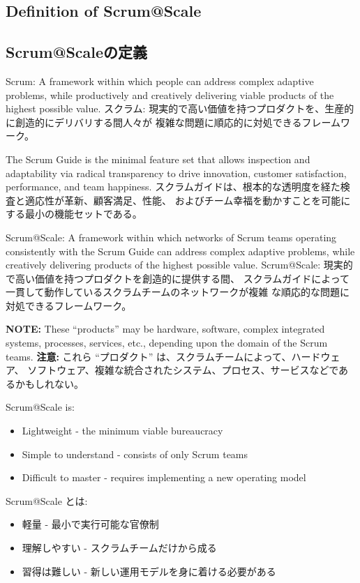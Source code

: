 \documentclass[12pt,a4paper,parskip=full]{scrartcl}
\begin{document}
\subsection{Definition of Scrum@Scale}
\fi
\subsection{Scrum@Scaleの定義}
Scrum: A framework within which people can address complex adaptive
problems, while productively and creatively delivering viable products of the
highest possible value.
\fi
スクラム: 現実的で高い価値を持つプロダクトを、生産的に創造的にデリバリする間人々が
複雑な問題に順応的に対処できるフレームワーク。

The Scrum Guide is the minimal feature set that allows inspection and
adaptability via radical transparency to drive innovation, customer satisfaction, performance, and
team happiness.
\fi
スクラムガイドは、根本的な透明度を経た検査と適応性が革新、顧客満足、性能、
およびチーム幸福を動かすことを可能にする最小の機能セットである。

Scrum@Scale: A framework within which networks of Scrum teams operating
consistently with the Scrum Guide can address complex adaptive problems,
while creatively delivering products of the highest possible value.
Scrum@Scale: 現実的で高い価値を持つプロダクトを創造的に提供する間、
\fi
スクラムガイドによって一貫して動作しているスクラムチームのネットワークが複雑
な順応的な問題に対処できるフレームワーク。

\textbf{NOTE:} These ``products'' may be hardware, software, complex
integrated systems, processes, services, etc., depending upon the domain of
the Scrum teams.
\fi
\textbf{注意:} これら ``プロダクト'' は、スクラムチームによって、ハードウェア、
ソフトウェア、複雑な統合されたシステム、プロセス、サービスなどであるかもしれない。

Scrum@Scale is:
\begin{itemize}
\item Lightweight - the minimum viable bureaucracy
\item Simple to understand - consists of only Scrum teams
\item Difficult to master - requires implementing a new operating model
\end{itemize}
\fi
Scrum@Scale とは:
\begin{itemize}
\item 軽量 - 最小で実行可能な官僚制
\item 理解しやすい - スクラムチームだけから成る
\item 習得は難しい - 新しい運用モデルを身に着ける必要がある
\end{itemize}
\end{document}
